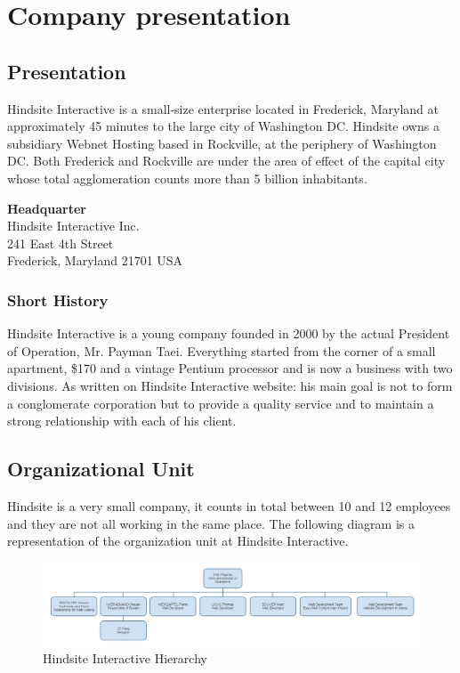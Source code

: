 \chapter{Company presentation}

\section{Presentation}

Hindsite Interactive is a small-size enterprise located in Frederick, Maryland at
approximately 45 minutes to the large city of Washington DC. Hindsite owns a
subsidiary Webnet Hosting based in Rockville, at the periphery of Washington
DC. Both Frederick and Rockville are under the area of effect of the capital
city whose total agglomeration counts more than 5 billion inhabitants.

\textbf{Headquarter} \\
Hindsite Interactive Inc.\\
241 East 4th Street\\
Frederick, Maryland 21701 USA\\

\subsection*{Short History}

Hindsite Interactive is a young company founded in 2000 by the actual
President of Operation, Mr. Payman Taei. Everything started from the corner
of a small apartment, \$170 and a vintage Pentium processor and is now a
business with two divisions. As written on Hindsite Interactive website: his main goal is not to form a conglomerate corporation but to provide a quality service and to maintain a
strong relationship with each of his client.

\section{Organizational Unit}

Hindsite is a very small company, it counts in total between 10 and 12
employees and they are not all working in the same place. The following diagram is a representation of the organization unit at Hindsite
Interactive.

\begin{figure}[ht]
\centering
\includegraphics[width=\textwidth]{img/hindsite_organigramme.png}
\caption{Hindsite Interactive Hierarchy}
\label{figure:organigramme}
\end{figure}

